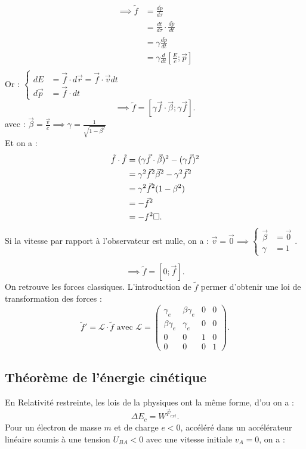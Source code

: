 \documentclass{article}
\begin{document}
\begin{align*}
    \implies \tilde{f} &= \frac{d\tilde{p}}{d\tau}\\
    &= \frac{dt}{d\tau} \cdot \frac{d\tilde{p}}{dt}\\
    &= \gamma \frac{d\tilde{p}}{dt}\\
    &= \gamma \frac{d}{dt} \left[\frac{E}{c};\vec{p}\right]\\
\end{align*} 
Or : \(
\begin{cases}
    dE &= \vec{f}\cdot d\vec{r} = \vec{f}\cdot \vec{v}dt \\
    d\vec{p} &= \vec{f}\cdot dt
\end{cases}
\)
\[
\implies \tilde{f}= \left[\gamma \vec{f}\cdot \vec{\beta}; \gamma \vec{f}\right]
.\] 
avec : \(\vec{\beta} = \frac{\vec{v}}{c} \implies \gamma = \frac{1}{\sqrt{1-\beta^2} }\)\\
Et on a : 
\begin{align*}
    \tilde{f}\cdot \tilde{f} &= (\gamma \vec{f}\cdot \vec{\beta})^2 - (\gamma \vec{f})^2\\
    &= \gamma ^2 \vec{f}^2 \vec{\beta}^2 - \gamma^2\vec{f}^2 \\
    &= \gamma^2 \vec{f}^2(1-\beta^2) \\
    &= -\vec{f}^2 \\
    &=-f^2 \space \square
.\end{align*}
Si la vitesse par rapport à l'observateur est nulle, on a : \(\vec{v} = \vec{0}\implies \begin{cases}
    \vec{\beta} &= \vec{0} \\
    \gamma &= 1
\end{cases}\).

\[
\implies \tilde{f} = \left[0;\vec{f}\right]
.\] 
On retrouve les forces classiques. L'introduction de \(\tilde{f}\) permer d'obtenir une loi de transformation des forces : 
\[
\tilde{f}' = \mathcal{L}\cdot \tilde{f} \text{ avec } \mathcal{L} = \begin{pmatrix} \gamma_e & \beta \gamma_e & 0 & 0\\ \beta \gamma_e &\gamma_e &0&0\\0&0&1&0\\0&0&0&1   \end{pmatrix} 
.\] 

\subsection{Théorème de l'énergie cinétique}
En Relativité restreinte, les lois de la physiques ont la même forme, d'ou on a : \\
\[
\Delta E_c = W^{\vec{F}_{ext}}
.\] 
Pour un électron de masse \(m\) et de charge \(e<0\), accéléré dans un accélérateur linéaire soumis à une tension \(U_{BA}<0\) avec une vitesse initiale \(v_A = 0\), on a : \\
\end{document}
